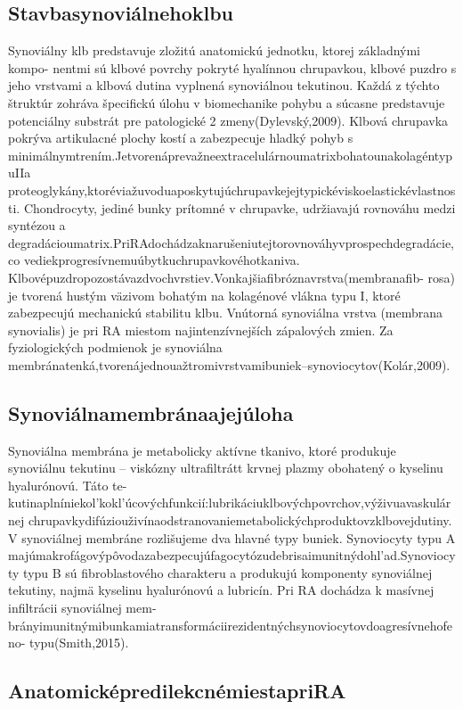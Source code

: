 \subsection{Stavbasynoviálnehoklbu}

Synoviálny klb predstavuje zložitú anatomickú jednotku, ktorej základnými kompo- nentmi sú klbové povrchy pokryté hyalínnou chrupavkou, klbové puzdro s jeho vrstvami a klbová dutina vyplnená synoviálnou tekutinou. Každá z týchto štruktúr zohráva špecifickú úlohu v biomechanike pohybu a súcasne predstavuje potenciálny substrát pre patologické 2 zmeny(Dylevský,2009). Klbová chrupavka pokrýva artikulacné plochy kostí a zabezpecuje hladký pohyb s minimálnymtrením.JetvorenáprevažneextracelulárnoumatrixbohatounakolagéntypuIIa proteoglykány,ktoréviažuvoduaposkytujúchrupavkejejtypickéviskoelastickévlastnosti. Chondrocyty, jediné bunky prítomné v chrupavke, udržiavajú rovnováhu medzi syntézou a degradácioumatrix.PriRAdochádzaknarušeniutejtorovnováhyvprospechdegradácie,co vediekprogresívnemuúbytkuchrupavkovéhotkaniva. Klbovépuzdropozostávazdvochvrstiev.Vonkajšiafibróznavrstva(membranafib- rosa) je tvorená hustým väzivom bohatým na kolagénové vlákna typu I, ktoré zabezpecujú mechanickú stabilitu klbu. Vnútorná synoviálna vrstva (membrana synovialis) je pri RA miestom najintenzívnejších zápalových zmien. Za fyziologických podmienok je synoviálna membránatenká,tvorenájednouažtromivrstvamibuniek--synoviocytov(Kolár,2009).


\subsection{Synoviálnamembránaajejúloha}

Synoviálna membrána je metabolicky aktívne tkanivo, ktoré produkuje synoviálnu tekutinu -- viskózny ultrafiltrátt krvnej plazmy obohatený o kyselinu hyalurónovú. Táto te- kutinaplníniekol’kokl’úcovýchfunkcií:lubrikáciuklbovýchpovrchov,výživuavaskulárnej chrupavkydifúziouživínaodstranovaniemetabolickýchproduktovzklbovejdutiny. V synoviálnej membráne rozlišujeme dva hlavné typy buniek. Synoviocyty typu A majúmakrofágovýpôvodazabezpecujúfagocytózudebrisaimunitnýdohl’ad.Synoviocyty typu B sú fibroblastového charakteru a produkujú komponenty synoviálnej tekutiny, najmä kyselinu hyalurónovú a lubricín. Pri RA dochádza k masívnej infiltrácii synoviálnej mem- brányimunitnýmibunkamiatransformáciirezidentnýchsynoviocytovdoagresívnehofeno- typu(Smith,2015).


\subsection{AnatomicképredilekcnémiestapriRA}

